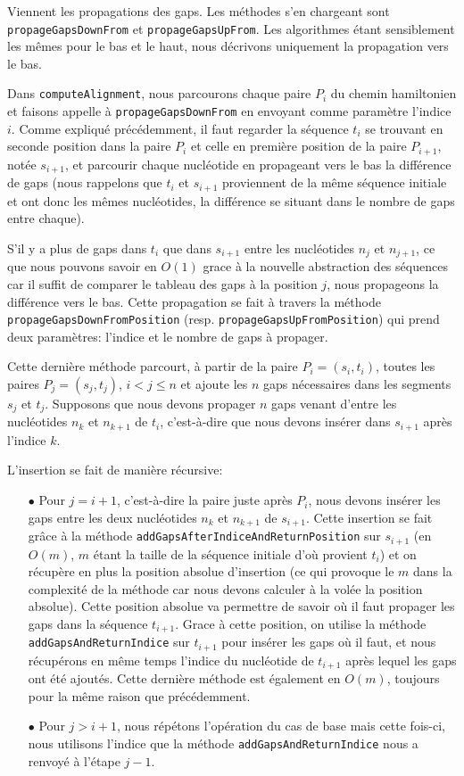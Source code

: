 Viennent les propagations des gaps.
Les méthodes s'en chargeant sont
\verb|propageGapsDownFrom| et \verb|propageGapsUpFrom|. Les algorithmes étant
sensiblement les mêmes pour le bas et le haut, nous décrivons uniquement la
propagation vers le bas.

Dans \verb|computeAlignment|, nous parcourons chaque paire $P_{i}$ du chemin
hamiltonien et faisons appelle à \verb|propageGapsDownFrom| en envoyant comme
paramètre l'indice $i$. Comme expliqué précédemment, il faut regarder la
séquence $t_{i}$ se trouvant en seconde position dans la paire $P_{i}$ et celle en
première position de la paire $P_{i + 1}$, notée $s_{i + 1}$, et parcourir chaque nucléotide en
propageant vers le bas la différence de gaps (nous rappelons que $t_{i}$ et
$s_{i + 1}$ proviennent de la même séquence initiale et ont donc les mêmes
nucléotides, la différence se situant dans le nombre de gaps entre
chaque).

S'il y a plus de gaps dans $t_{i}$ que dans $s_{i + 1}$ entre les
nucléotides $n_{j}$ et $n_{j + 1}$, ce que nous pouvons savoir en $O(1)$ grace à
la nouvelle abstraction des séquences car il suffit de comparer le tableau des
gaps à la position $j$, nous propageons la différence vers le bas.
Cette propagation se fait à travers la méthode
\verb|propageGapsDownFromPosition| (resp. \verb|propageGapsUpFromPosition|) qui
prend deux paramètres: l'indice et le nombre de gaps à propager.

Cette dernière méthode parcourt, à partir de la paire $P_{i} = (s_{i}, t_{i})$,
toutes les paires $P_{j} = (s_{j}, t_{j})$, $i < j \leq n$ et ajoute les $n$
gaps nécessaires dans les segments $s_{j}$ et $t_{j}$. Supposons que nous devons
propager $n$ gaps venant d'entre les nucléotides $n_{k}$ et $n_{k + 1}$ de
$t_{i}$, c'est-à-dire que nous devons insérer dans $s_{i + 1}$ après l'indice
$k$.

L'insertion se fait de manière récursive:
\begin{itemize}
	\item[$\bullet$] Pour $j = i + 1$, c'est-à-dire la paire juste après $P_{i}$, nous
		devons insérer les gaps entre les deux nucléotides $n_{k}$ et $n_{k +
		1}$ de $s_{i + 1}$. Cette insertion se fait grâce à la méthode
		\verb|addGapsAfterIndiceAndReturnPosition| sur $s_{i + 1}$ (en $O(m)$,
		$m$ étant la taille de la séquence initiale d'où provient $t_{i}$) et on
		récupère en plus la position absolue d'insertion (ce qui provoque le $m$
		dans la complexité de la méthode car nous devons calculer à la volée la
		position absolue). Cette position absolue va permettre de savoir où il
		faut propager les gaps dans la séquence $t_{i + 1}$. Grace à cette
		position, on utilise la méthode \verb|addGapsAndReturnIndice| sur $t_{i
		+ 1}$ pour insérer les gaps où il faut, et nous récupérons en même temps
		l'indice du nucléotide de $t_{i + 1}$ après lequel les gaps ont été
		ajoutés. Cette dernière méthode est également en $O(m)$, toujours pour
		la même raison que précédemment.
	\item[$\bullet$] Pour $j > i + 1$, nous répétons l'opération du cas de base mais cette
		fois-ci, nous utilisons l'indice que la méthode
		\verb|addGapsAndReturnIndice| nous a renvoyé à l'étape $j - 1$.
\end{itemize}

